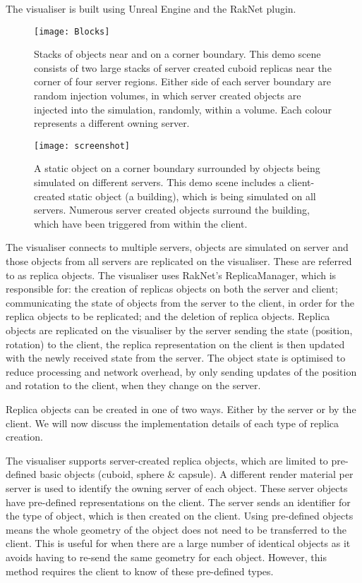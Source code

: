 The visualiser is built using Unreal Engine and the RakNet plugin.

\begin{figure}[!t]
	\centering
	\texttt{[image: Blocks]}
	\caption{Stacks of objects near and on a corner boundary. This demo scene consists of two large stacks of server created cuboid replicas near the corner of four server regions. Either side of each server boundary are random injection volumes, in which server created objects are injected into the simulation, randomly, within a volume. Each colour represents a different owning server.}
	\label{fig_screen1}
\end{figure}

\begin{figure}[!t]
	\centering
	\texttt{[image: screenshot]}
	\caption{A static object on a corner boundary surrounded by objects being simulated on different servers. This demo scene includes a client-created static object (a building), which is being simulated on all servers. Numerous server created objects surround the building, which have been triggered from within the client.}
	\label{fig_screen2}
\end{figure}

The visualiser connects to multiple servers, objects are simulated on server and those objects from all servers are replicated on the visualiser. These are referred to as replica objects. The visualiser uses RakNet's ReplicaManager, which is responsible for: the creation of replicas objects on both the server and client; communicating the state of objects from the server to the client, in order for the replica objects to be replicated; and the deletion of replica objects. Replica objects are replicated on the visualiser by the server sending the state (position, rotation) to the client, the replica representation on the client is then updated with the newly received state from the server. The object state is optimised to reduce processing and network overhead, by only sending updates of the position and rotation to the client, when they change on the server.

Replica objects can be created in one of two ways. Either by the server or by the client. We will now discuss the implementation details of each type of replica creation.

The visualiser supports server-created replica objects, which are limited to pre-defined basic objects (cuboid, sphere \& capsule). A different render material per server is used to identify the owning server of each object. These server objects have pre-defined representations on the client. The server sends an identifier for the type of object, which is then created on the client. Using pre-defined objects means the whole geometry of the object does not need to be transferred to the client. This is useful for when there are a large number of identical objects as it avoids having to re-send the same geometry for each object. However, this method requires the client to know of these pre-defined types.

